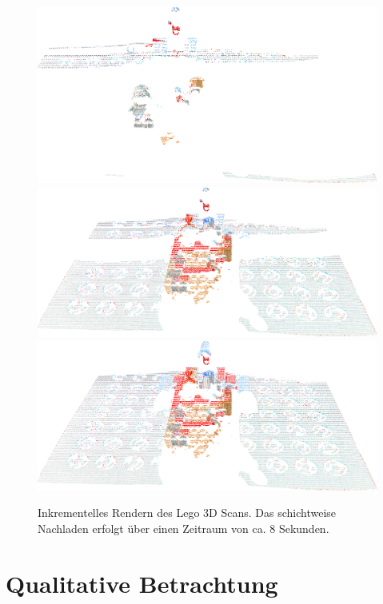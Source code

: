 \documentclass[hyperref, beleg, german, final, twoside]{cgvpub}
\begin{document}
\begin{figure}
	\centering
	\includegraphics[width = \linewidth]{images/Lego/126}
	\includegraphics[width = \linewidth]{images/Lego/150}
	\includegraphics[width = \linewidth]{images/Lego/170}
	\caption{Inkrementelles Rendern des Lego 3D Scans.
	Das schichtweise Nachladen erfolgt über einen Zeitraum von ca. 8 Sekunden.}%
	\label{img:lego}
\end{figure}

\section{Qualitative Betrachtung}
\end{document}

